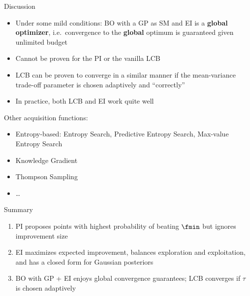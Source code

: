 \documentclass[main]{subfiles}
\begin{document}
\begin{frame}{Discussion}
    \begin{itemize}
        \item Under some mild conditions: BO with a GP as SM and EI is a \textbf{global optimizer}, i.e.\ convergence to the \textbf{global} optimum is guaranteed given unlimited budget~
        \item Cannot be proven for the PI or the vanilla LCB
        \item LCB can be proven to converge in a similar manner if the mean-variance trade-off parameter is chosen adaptively and ``correctly''~
        \item In practice, both LCB and EI work quite well
    \end{itemize}
    \vfill
    Other acquisition functions:
    \begin{itemize}
        \item Entropy-based: Entropy Search, Predictive Entropy Search, Max-value Entropy Search
        \item Knowledge Gradient
        \item Thompson Sampling
        \item \ldots
    \end{itemize}
\end{frame}


\begin{frame}{Summary}
\begin{enumerate}
    \item PI proposes points with highest probability of beating $\fmin$ but ignores improvement size
    \item EI maximizes expected improvement, balances exploration and exploitation, and has a closed form for Gaussian posteriors
    \item BO with GP + EI enjoys global convergence guarantees; LCB converges if $\tau$ is chosen adaptively
\end{enumerate}
\end{frame}
\end{document}
